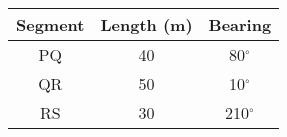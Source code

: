 \begin{tabular}{|c|c|c|}
\hline
    Segment & Length (m) & Bearing \\
    \hline
        PQ & 40 & 80$^\circ$ \\
        QR & 50 & 10$^\circ$ \\
        RS & 30 & 210$^\circ$ \\
    \hline
\end{tabular}
